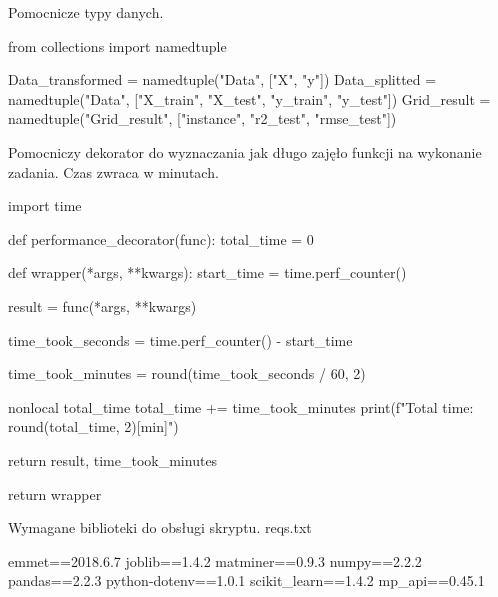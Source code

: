 \vspace{\baselineskip}
Pomocnicze typy danych.

\begin{pythoncode}
from collections import namedtuple

Data_transformed = namedtuple("Data", ["X", "y"])
Data_splitted = namedtuple("Data", ["X_train", "X_test", "y_train", "y_test"])
Grid_result = namedtuple("Grid_result", ["instance", "r2_test", "rmse_test"])
\end{pythoncode}

\vspace{\baselineskip}
Pomocniczy dekorator do wyznaczania jak długo zajęło funkcji na wykonanie zadania. Czas zwraca w minutach.
\begin{pythoncode}
import time

def performance_decorator(func):
    total_time = 0

    def wrapper(*args, **kwargs):
        start_time = time.perf_counter()

        result = func(*args, **kwargs)

        time_took_seconds = time.perf_counter() - start_time

        time_took_minutes = round(time_took_seconds / 60, 2)

        nonlocal total_time
        total_time += time_took_minutes
        print(f"Total time: {round(total_time, 2)}[min]")

        return result, time_took_minutes

    return wrapper
\end{pythoncode}

\vspace{\baselineskip}
Wymagane biblioteki do obsługi skryptu.
reqs.txt
\begin{pythoncode}
emmet==2018.6.7
joblib==1.4.2
matminer==0.9.3
numpy==2.2.2
pandas==2.2.3
python-dotenv==1.0.1
scikit_learn==1.4.2
mp_api==0.45.1
\end{pythoncode}